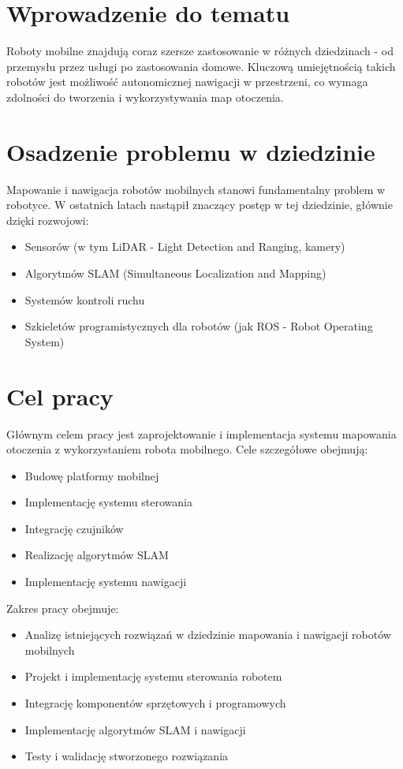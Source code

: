 \documentclass[a4paper,twoside,12pt]{book}
\begin{document}
\section{Wprowadzenie do tematu}
Roboty mobilne znajdują coraz szersze zastosowanie w różnych dziedzinach - od przemysłu przez usługi po zastosowania domowe. Kluczową umiejętnością takich robotów jest możliwość autonomicznej nawigacji w przestrzeni, co wymaga zdolności do tworzenia i wykorzystywania map otoczenia.

\section{Osadzenie problemu w dziedzinie}
Mapowanie i nawigacja robotów mobilnych stanowi fundamentalny problem w robotyce. W ostatnich latach nastąpił znaczący postęp w tej dziedzinie, głównie dzięki rozwojowi:
\begin{itemize}
\item Sensorów (w tym LiDAR - Light Detection and Ranging, kamery)
\item Algorytmów SLAM (Simultaneous Localization and Mapping)
\item Systemów kontroli ruchu
\item Szkieletów programistycznych dla robotów (jak ROS - Robot Operating System)
\end{itemize}

\section{Cel pracy}
Głównym celem pracy jest zaprojektowanie i implementacja systemu mapowania otoczenia z wykorzystaniem robota mobilnego. Cele szczegółowe obejmują:
\begin{itemize}
\item Budowę platformy mobilnej
\item Implementację systemu sterowania
\item Integrację czujników
\item Realizację algorytmów SLAM
\item Implementację systemu nawigacji
\end{itemize}

Zakres pracy obejmuje:
\begin{itemize}
\item Analizę istniejących rozwiązań w dziedzinie mapowania i nawigacji robotów mobilnych
\item Projekt i implementację systemu sterowania robotem
\item Integrację komponentów sprzętowych i programowych
\item Implementację algorytmów SLAM i nawigacji
\item Testy i walidację stworzonego rozwiązania
\end{itemize}
\end{document}
